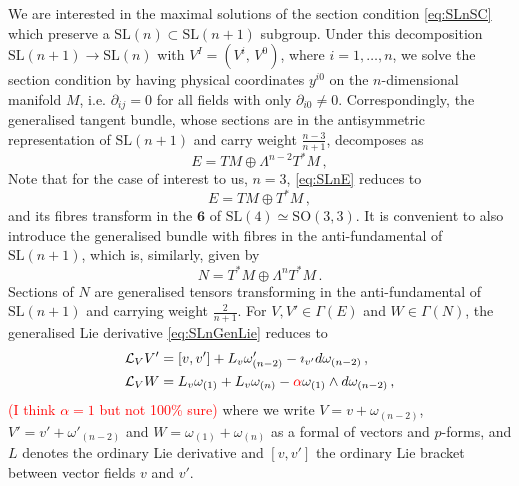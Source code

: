 \documentclass[a4paper, 11pt]{article}
\numberwithin{equation}{section}
\newcommand{\SL}[1]{\mathrm{SL}( #1 )}
\newcommand{\SO}[1]{\mathrm{SO}( #1 )}
\newcommand{\+}{\oplus}
\newcommand{\gL}{\mathcal{L}}
\newcommand{\EM}[1]{\textcolor{red}{#1}}
\begin{document}
We are interested in the maximal solutions of the section condition \eqref{eq:SLnSC} which preserve a $\SL{n} \subset \SL{n+1}$ subgroup. Under this decomposition $\SL{n+1} \rightarrow \SL{n}$ with $V^I = \left( V^i,\, V^0 \right)$, where $i = 1, \ldots, n$, we solve the section condition by having physical coordinates $y^{i0}$ on the $n$-dimensional manifold $M$, i.e. $\partial_{ij} = 0$ for all fields with only $\partial_{i0} \neq 0$. Correspondingly, the generalised tangent bundle, whose sections are in the antisymmetric representation of $\SL{n+1}$ and carry weight $\frac{n-3}{n+1}$, decomposes as
\begin{equation} \label{eq:SLnE}
	E = TM \oplus \Lambda^{n-2} T^*M \,,
\end{equation}
Note that for the case of interest to us, $n=3$, \eqref{eq:SLnE} reduces to
\begin{equation}
	E = TM \oplus T^*M \,,
\end{equation}
and its fibres transform in the $\mathbf{6}$ of $\SL{4} \simeq \SO{3,3}$. It is convenient to also introduce the generalised bundle with fibres in the anti-fundamental of $\SL{n+1}$, which is, similarly, given by
\begin{equation}
	N = T^*M \oplus \Lambda^{n} T^*M \,.
\end{equation}
Sections of $N$ are generalised tensors transforming in the anti-fundamental of $\SL{n+1}$ and carrying weight $\frac{2}{n+1}$. For $V, V' \in \Gamma(E)$ and $W \in \Gamma(N)$, the generalised Lie derivative \eqref{eq:SLnGenLie} reduces to
\begin{equation}
	\begin{split}
		\gL_{V} V' &= [v, v'] + L_{v} \omega'_{(n-2)} - \imath_{v'} d\omega_{(n-2)} \,, \\
		\gL_{V} W &= L_v \omega_{(1)} + L_v \omega_{(n)} - \EM{\alpha} \omega_{(1)} \wedge d\omega_{(n-2)} \,,
	\end{split}
\end{equation}
\EM{(I think $\alpha = 1$ but not 100\% sure)}
where we write $V = v + \omega_{(n-2)}$, $V' = v' + \omega'_{(n-2)}$ and $W = \omega_{(1)} + \omega_{(n)}$ as a formal of vectors and $p$-forms, and $L$ denotes the ordinary Lie derivative and $[v,v']$ the ordinary Lie bracket between vector fields $v$ and $v'$.
\end{document}
